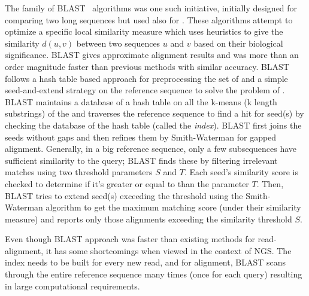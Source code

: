 The family of BLAST~\citep{altschul1990basic, altschul1997gapped} algorithms was one such initiative, initially designed for comparing two long sequences but used also for \ra. These algorithms attempt to optimize a specific local similarity measure which uses heuristics to give the similarity $d(u, v)$ between two sequences $u$ and $v$ based on their biological significance. BLAST gives approximate alignment results and was more than an order magnitude faster than previous methods with similar accuracy. BLAST follows a hash table based approach for preprocessing the set of \reads and a simple seed-and-extend strategy on the reference sequence to solve the problem of \ra. BLAST maintains a database of a hash table on all the k-means (k length substrings) of the \reads and traverses the reference sequence to find a hit for seed(s) by checking the database of the hash table (called the \textit{index}). BLAST first joins the seeds without gaps and then refines them by Smith-Waterman for gapped alignment. Generally, in a big reference sequence, only a few subsequences have sufficient similarity to the query; BLAST finds these by filtering irrelevant matches using two threshold parameters $S$ and $T$. Each seed's similarity score is checked to determine if it's greater or equal to than the parameter $T$. Then, BLAST tries to extend seed(s) exceeding the threshold using the Smith-Waterman algorithm to get the maximum matching score (under their similarity measure) and reports only those alignments exceeding the similarity threshold $S$.

Even though BLAST approach was faster than existing methods for read-alignment, it has some shortcomings when viewed in the context of NGS. The index needs to be built for every new read, and for alignment, BLAST scans through the entire reference sequence many times (once for each query) resulting in large computational requirements. 


